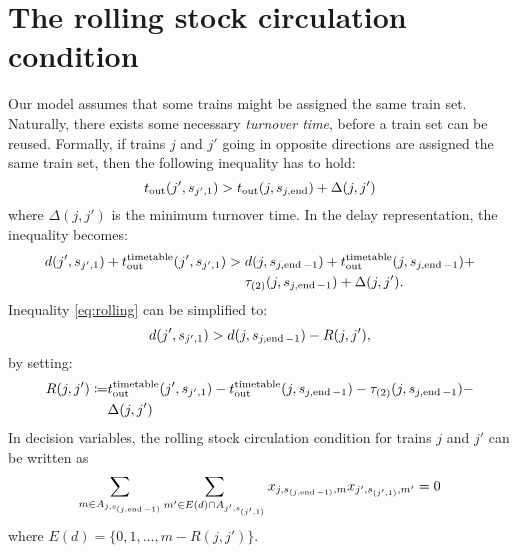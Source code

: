 \section{The rolling stock circulation condition}
Our model assumes that some trains might be assigned the same train set. Naturally,
there exists some necessary \emph{turnover time}, before a train set can be
reused. Formally, if trains $j$ and $j'$ going in opposite directions are
assigned the same train set, then the following inequality has to hold:
\begin{equation}
  t_\text{out}(j', s_{j',1}) > t_\text{out}(j, s_{j,\operatorname*{end}}) + \Delta(j, j')
\end{equation}
where $\Delta(j, j')$ is the minimum turnover time. In the delay
representation, the inequality becomes:
\begin{equation}
  \label{eq:rolling}
  \begin{split}
    d(j',s_{j',1}) + t_\text{out}^\text{timetable}(j',s_{j',1}) > & \; d(j, s_{j,\operatorname*{end}-1}) + t_\text{out}^\text{timetable}(j, s_{j,\operatorname*{end}-1}) + \\
    & \; \tau_{(2)}(j, s_{j,\operatorname*{end}-1}) + \Delta(j,j').
  \end{split}
\end{equation}
Inequality \eqref{eq:rolling} can be simplified to:
\begin{equation}
  d(j',s_{j',1}) > d(j, s_{j,\operatorname*{end}-1}) - R(j,j'),
\end{equation}
by setting:
\begin{equation}
  \label{eq:rolling2}
  \begin{split}
    R(j, j') \coloneq &t_\text{out}^\text{timetable}(j',s_{j',1}) - t_\text{out}^\text{timetable}(j, s_{j,\operatorname*{end}-1}) - \tau_{(2)}(j,s_{j,\operatorname*{end}-1}) - \\
                      & \Delta(j,j')
  \end{split}
\end{equation}
In decision variables, the rolling stock circulation condition for trains $j$
and $j'$ can be written as
\begin{equation}
  \label{eq:qubo:rollingstock}
  \sum_{m \in A_{j, s_{(j, \operatorname*{end}-1)}}} \sum_{m' \in E(d) \cap A_{j',s_{(j',1)}}} x_{j,s_{(j,\operatorname*{end}-1)},m}x_{j', s_{(j',1)},m'} = 0
\end{equation}
where $E(d) = \{0, 1, \ldots, m-R(j, j')\}$.

